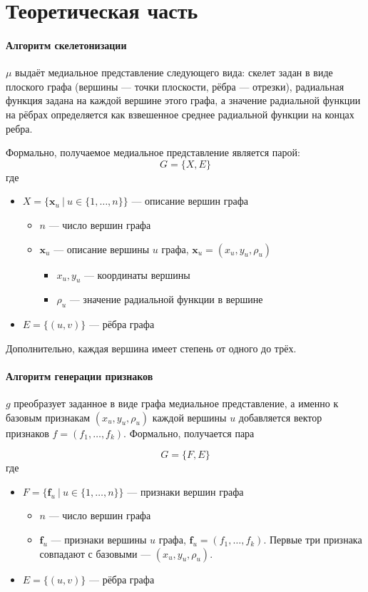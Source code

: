 \documentclass[12pt,twoside]{article}
\newcommand{\x}{\mathbf{x}}
\begin{document}
\section{Теоретическая часть}

\paragraph{Алгоритм скелетонизации} $\mu$ выдаёт медиальное представление следующего вида: скелет задан в виде плоского графа (вершины --- точки плоскости, рёбра --- отрезки), радиальная функция задана на каждой вершине этого графа, а значение радиальной функции на рёбрах определяется как взвешенное среднее радиальной функции на концах ребра.

Формально, получаемое медиальное представление является парой:
$$G = \{X, E\}$$
где
\begin{itemize}
\item $X = \{\x_u\ |\ u \in \{1, \ldots, n\}\}$ --- описание вершин графа
    \begin{itemize}
    \item $n$ --- число вершин графа
    \item $\x_u$ --- описание вершины $u$ графа, $\x_u = (x_u, y_u, \rho_u)$
            \begin{itemize}
            \item $x_u, y_u$ --- координаты вершины
            \item $\rho_u$ --- значение радиальной функции в вершине
            \end{itemize}
    \end{itemize}
\item $E = \{(u,v)\}$ --- рёбра графа
\end{itemize}
Дополнительно, каждая вершина имеет степень от одного до трёх.

\paragraph{Алгоритм генерации признаков} $g$ преобразует заданное в виде графа медиальное представление, а именно к базовым признакам $(x_u, y_u, \rho_u)$ каждой вершины $u$ добавляется вектор признаков $f = (f_1, \ldots, f_k)$. Формально, получается пара

$$G = \{F, E\}$$
где
\begin{itemize}
\item $F = \{\mathbf{f}_u\ |\ u \in \{1, \ldots, n\}\}$ --- признаки вершин графа
    \begin{itemize}
    \item $n$ --- число вершин графа
    \item $\mathbf{f}_u$ --- признаки вершины $u$ графа, $\mathbf{f}_u = (f_1, \ldots, f_k)$. Первые три признака совпадают с базовыми --- $(x_u, y_u, \rho_u)$.
    \end{itemize}
\item $E = \{(u,v)\}$ --- рёбра графа
\end{itemize}
\end{document}
